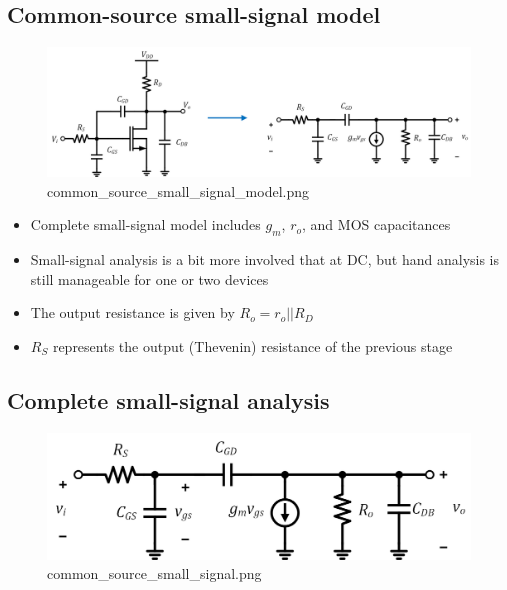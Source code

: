 \documentclass[11pt]{article}
\providecommand{\tightlist}{%
      \setlength{\itemsep}{0pt}\setlength{\parskip}{0pt}}
\begin{document}
    \hypertarget{common-source-small-signal-model}{%
\subsection{Common-source small-signal
model}\label{common-source-small-signal-model}}

    \begin{figure}
\centering
\includegraphics{common_source_small_signal_model.png}
\caption{common\_source\_small\_signal\_model.png}
\end{figure}

    \begin{itemize}
\tightlist
\item
  Complete small-signal model includes \(g_m\), \(r_o\), and MOS
  capacitances
\item
  Small-signal analysis is a bit more involved that at DC, but hand
  analysis is still manageable for one or two devices
\item
  The output resistance is given by \(R_o = r_o||R_D\)
\item
  \(R_S\) represents the output (Thevenin) resistance of the previous
  stage
\end{itemize}

    \hypertarget{complete-small-signal-analysis}{%
\subsection{Complete small-signal
analysis}\label{complete-small-signal-analysis}}

    \begin{figure}
\centering
\includegraphics{common_source_small_signal.png}
\caption{common\_source\_small\_signal.png}
\end{figure}
\end{document}
